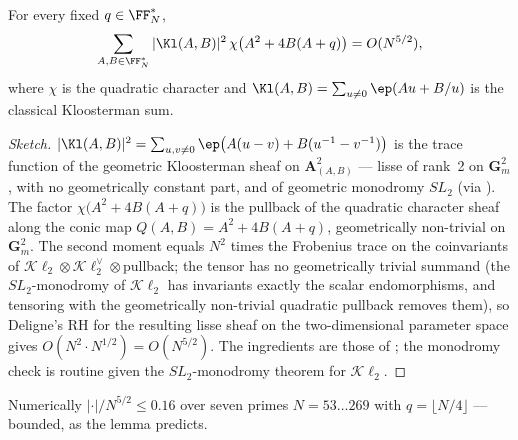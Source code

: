 \begin{lemma}\label{lem:twisted}
For every fixed $q\in\FF_N^*$,
\[
  \sum_{A,B\in\FF_N^*}|\Kl(A,B)|^2\,
  \chi\bigl(A^2+4B(A+q)\bigr)=O(N^{5/2}),
\]
where $\chi$ is the quadratic character and $\Kl(A,B)=\sum_{u\neq0}
\ep(Au+B/u)$ is the classical Kloosterman sum.
\end{lemma}

\begin{proof}[Sketch]
$|\Kl(A,B)|^2=\sum_{u,v\neq0}\ep\bigl(A(u-v)+B(u^{-1}-v^{-1})\bigr)$ is the
trace function of the geometric Kloosterman sheaf on
$\mathbf A^2_{(A,B)}$ --- lisse of rank~2 on $\mathbf G_m^2$, with no
geometrically constant part, and of geometric monodromy $SL_2$
\cite{KR2003} (via \cite{KR2000}).  The factor
$\chi\bigl(A^2+4B(A+q)\bigr)$ is the pullback of the quadratic character
sheaf along the conic map $Q(A,B)=A^2+4B(A+q)$, geometrically non-trivial
on $\mathbf G_m^2$.  The second moment equals
$N^2$ times the Frobenius trace on the coinvariants of
$\mathcal K\ell_2\otimes\mathcal K\ell_2^{\vee}\otimes{}$pullback;
the tensor has no geometrically trivial summand (the $SL_2$-monodromy of
$\mathcal K\ell_2$ has invariants exactly the scalar endomorphisms, and
tensoring with the geometrically non-trivial quadratic pullback removes
them), so Deligne's RH for the resulting lisse sheaf on the two-dimensional
parameter space gives $O(N^2\cdot N^{1/2})=O(N^{5/2})$.  The ingredients
are those of \cite{KR2003}; the monodromy check is routine given the
$SL_2$-monodromy theorem for $\mathcal K\ell_2$.
\end{proof}

Numerically $|\cdot|/N^{5/2}\le0.16$ over seven primes
$N=53\dots269$ with $q=\lfloor N/4\rfloor$ --- bounded, as the lemma
predicts.
